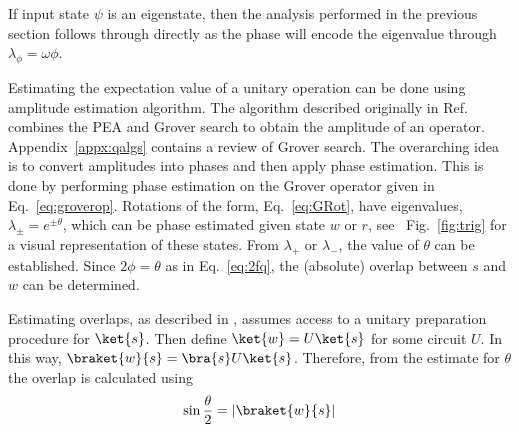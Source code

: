 \documentclass[11pt,oneside,final]{huthesis}%
\begin{document}
If input state $\psi$ is an eigenstate, then the analysis performed in the previous section follows through directly as the phase will encode the eigenvalue through $\lambda_\phi=\omega\phi$.  

Estimating the expectation value of a unitary operation can be done using amplitude estimation algorithm. The algorithm described originally in Ref.~\cite{Brassard00} combines the PEA and Grover search to obtain the amplitude of an operator.  Appendix~\ref{appx:qalgs} contains a review of Grover search. %
The overarching idea is to convert amplitudes into phases and then apply phase estimation.  This is done by performing phase estimation on the Grover operator  given in Eq.~\eqref{eq:groverop}.  Rotations of the form, Eq.~\eqref{eq:GRot}, have eigenvalues, $\lambda_{\pm}=e^{\pm \theta}$, which can be phase estimated given state $w$ or $r$, see ~Fig.~\ref{fig:trig} for a visual representation of these states. From $\lambda_+$ or $\lambda_-$, the value of $\theta$ can be established.  Since $2\phi=\theta$ as in Eq.~\eqref{eq:2fq}, the (absolute) overlap between $s$ and $w$ can be determined. 

Estimating overlaps, as described in \cite{Knill07}, assumes access to a unitary preparation procedure for $\ket{s}$.  Then define $\ket{w}=U\ket{s}$ for some circuit $U$.  In this way, $\braket{w}{s}=\bra{s}U\ket{s}$.  Therefore, from the estimate for $\theta$ the overlap is calculated using
\begin{equation}
	\sin\frac{\theta}{2}=|\braket{w}{s}|
\end{equation}
\end{document}
